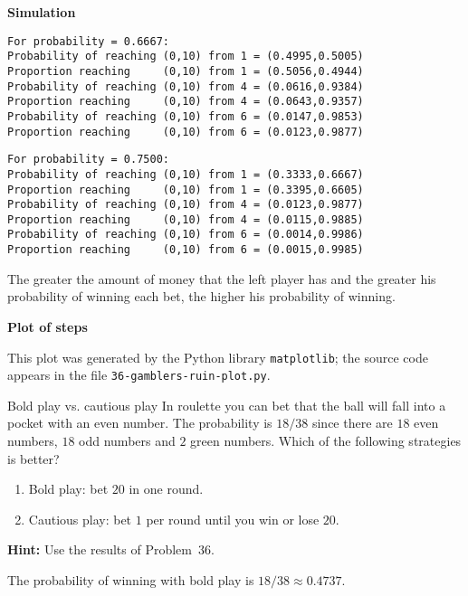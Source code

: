 \newpage

\textbf{Simulation}
\begin{verbatim}
For probability = 0.6667:
Probability of reaching (0,10) from 1 = (0.4995,0.5005)
Proportion reaching     (0,10) from 1 = (0.5056,0.4944)
Probability of reaching (0,10) from 4 = (0.0616,0.9384)
Proportion reaching     (0,10) from 4 = (0.0643,0.9357)
Probability of reaching (0,10) from 6 = (0.0147,0.9853)
Proportion reaching     (0,10) from 6 = (0.0123,0.9877)
\end{verbatim}

\begin{verbatim}
For probability = 0.7500:
Probability of reaching (0,10) from 1 = (0.3333,0.6667)
Proportion reaching     (0,10) from 1 = (0.3395,0.6605)
Probability of reaching (0,10) from 4 = (0.0123,0.9877)
Proportion reaching     (0,10) from 4 = (0.0115,0.9885)
Probability of reaching (0,10) from 6 = (0.0014,0.9986)
Proportion reaching     (0,10) from 6 = (0.0015,0.9985)
\end{verbatim}
The greater the amount of money that the left player has and the greater his probability of winning each bet, the higher his probability of winning.

\textbf{Plot of steps}

This plot was generated by the Python library \texttt{matplotlib}; the source code appears in the file \texttt{36-gamblers-ruin-plot.py}.
\begin{center}

\end{center}


\newpage

\begin{prob}{Bold play vs. cautious play}
In roulette you can bet that the ball will fall into a pocket with an even number. The probability is $18/38$ since there are $18$ even numbers, $18$ odd numbers and $2$ green numbers. Which of the following strategies is better?
\begin{enumerate}
\item Bold play: bet $20$ in one round.
\item Cautious play: bet $1$ per round until you win or lose $20$.
\end{enumerate}
\textbf{Hint:} Use the results of Problem~36.
\end{prob}

\solution{}

The probability of winning with bold play is $18/38\approx 0.4737$.

